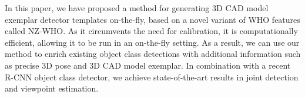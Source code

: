 In this paper, we have proposed a method for generating 3D CAD model
exemplar detector templates on-the-fly, based on a novel variant of
WHO features called NZ-WHO. As it circumvents the need for
calibration, it is computationally efficient, allowing it to be run in
an on-the-fly setting. As a result, we can use our method to enrich
existing object class detections with additional information such as
precise 3D pose and 3D CAD model exemplar. In combination with a
recent R-CNN object class detector, we achieve state-of-the-art
results in joint detection and viewpoint estimation.
